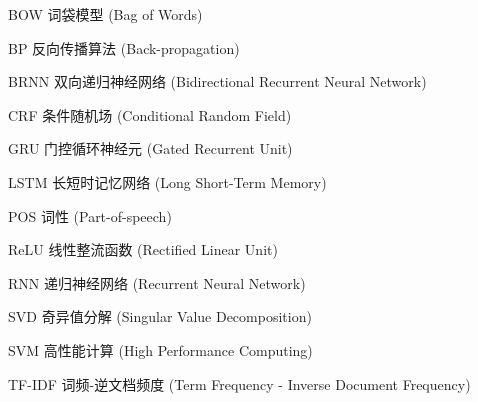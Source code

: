 \begin{denotation}[3cm]

\item[BOW] 词袋模型 (Bag of Words)
\item[BP] 反向传播算法 (Back-propagation)
\item[BRNN] 双向递归神经网络 (Bidirectional Recurrent Neural Network)
\item[CRF] 条件随机场 (Conditional Random Field)
\item[GRU] 门控循环神经元 (Gated Recurrent Unit)
\item[LSTM] 长短时记忆网络 (Long Short-Term Memory)
\item[POS] 词性 (Part-of-speech)
\item[ReLU] 线性整流函数 (Rectified Linear Unit)
\item[RNN] 递归神经网络 (Recurrent Neural Network)
\item[SVD] 奇异值分解 (Singular Value Decomposition)
\item[SVM] 高性能计算 (High Performance Computing)
\item[TF-IDF] 词频-逆文档频度 (Term Frequency - Inverse Document Frequency)

\end{denotation}

